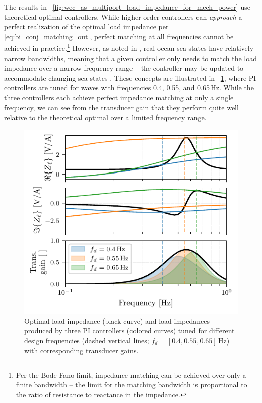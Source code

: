 \documentclass[twocolumn]{autart}
\begin{document}
The results in \figurename~\ref{fig:wec_as_multiport_load_impedance_for_mech_power} use theoretical optimal controllers.
While higher-order controllers can \emph{approach} a perfect realization of the optimal load impedance per \eqref{eq:bi_conj_matching_out}, perfect matching at all frequencies cannot be achieved in practice.\footnote{Per the Bode-Fano limit, impedance matching can be achieved over only a finite bandwidth -- the limit for the matching bandwidth is proportional to the ratio of resistance to reactance in the impedance.}
However, as noted in \cite{Coe2020a}, real ocean sea states have relatively narrow bandwidths, meaning that a given controller only needs to match the load impedance over a narrow frequency range -- the controller may be updated to accommodate changing sea states \cite{Forbush:2022aa}.
These concepts are illustrated in \figurename~\ref{fig:gfx/wec_as_multiport_pi_controllers_real_imag}, where PI controllers are tuned for waves with frequencies 0.4, 0.55, and 0.65\,Hz.
While the three controllers each achieve perfect impedance matching at only a single frequency, we can see from the transducer gain that they perform quite well relative to the theoretical optimal over a limited frequency range.

\begin{figure}[tb]
        \centering
        \includegraphics[width=1\columnwidth]{wec_as_multiport_pi_controllers_real_imag.pdf}
        \caption{Optimal load impedance (black curve) and load impedances produced by three PI controllers (colored curves) tuned for different design frequencies (dashed vertical lines; $f_d = [0.4, 0.55, 0.65]$\,Hz) with corresponding transducer gains.}
        \label{fig:gfx/wec_as_multiport_pi_controllers_real_imag}
\end{figure}
\end{document}
